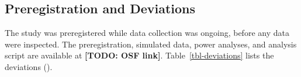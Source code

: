 \documentclass[
  man,
  floatsintext,
  longtable,
  nolmodern,
  notxfonts,
  notimes,
  colorlinks=true,linkcolor=blue,citecolor=blue,urlcolor=blue]{apa7}
\begin{document}
\subsection{Preregistration and
Deviations}\label{preregistration-and-deviations}

The study was preregistered while data collection was ongoing, before
any data were inspected. The preregistration, simulated data, power
analyses, and analysis script are available at \textbf{{[}TODO: OSF
link{]}}. Table~\ref{tbl-deviations} lists the deviations
().

\begin{table}

{\caption{{Deviations From the Preregistration}{\label{tbl-deviations}}}
\vspace{-20pt}}


\end{table}
\end{document}
